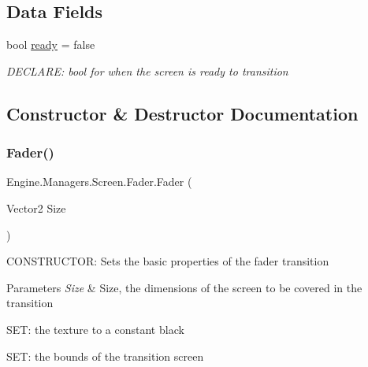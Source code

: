 \subsection*{Data Fields}
\begin{DoxyCompactItemize}
\item 
bool \hyperlink{a00534_aa2cfb68abbeb910ec086ddb3fc5a06c8}{ready} = false
\begin{DoxyCompactList}\small\item\em D\+E\+C\+L\+A\+RE\+: bool for when the screen is ready to transition \end{DoxyCompactList}\end{DoxyCompactItemize}


\subsection{Constructor \& Destructor Documentation}
\mbox{\label{a00534_a6dd5b212e90e0c0db26e280c723dcd4f}} 
\subsubsection{\texorpdfstring{Fader()}{Fader()}\hspace{0.1cm}{\footnotesize\ttfamily [1/3]}}
{\footnotesize\ttfamily Engine.\+Managers.\+Screen.\+Fader.\+Fader (\begin{DoxyParamCaption}\item[{Vector2}]{Size }\end{DoxyParamCaption})\hspace{0.3cm}{\ttfamily [inline]}}



C\+O\+N\+S\+T\+R\+U\+C\+T\+OR\+: Sets the basic properties of the fader transition 


\begin{DoxyParams}{Parameters}
{\em Size} & Size, the dimensions of the screen to be covered in the transition\\
\hline
\end{DoxyParams}
S\+ET\+: the texture to a constant black

S\+ET\+: the bounds of the transition screen \mbox{\label{a00534_ac33d2bf58aea98d5739f2bb94540be63}} 
